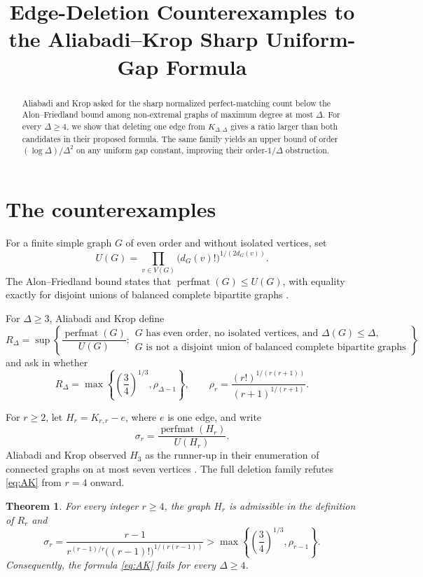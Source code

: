 \documentclass[11pt]{amsart}
\title[Edge-deletion counterexamples]
{Edge-Deletion Counterexamples to the Aliabadi--Krop
Sharp Uniform-Gap Formula}
\date{}
\newtheorem{theorem}{Theorem}
\theoremstyle{remark}
\newcommand{\perfmat}{\operatorname{perfmat}}
\begin{document}
\begin{abstract}
Aliabadi and Krop asked for the sharp normalized perfect-matching count
below the Alon--Friedland bound among non-extremal graphs of maximum degree
at most $\Delta$. For every $\Delta\ge4$, we show that deleting one edge
from $K_{\Delta,\Delta}$ gives a ratio larger than both candidates in their
proposed formula. The same family yields an upper bound of order
$(\log\Delta)/\Delta^2$ on any uniform gap constant, improving their
order-$1/\Delta$ obstruction.
\end{abstract}

\maketitle

\section{The counterexamples}

For a finite simple graph $G$ of even order and without isolated vertices, set
\[
U(G)=\prod_{v\in V(G)}\bigl(d_G(v)!\bigr)^{1/(2d_G(v))}.
\]
The Alon--Friedland bound states that
$\perfmat(G)\le U(G)$, with equality exactly for disjoint unions of
balanced complete bipartite graphs \cite{AlonFriedland}.

For $\Delta\ge3$, Aliabadi and Krop define
\[
R_\Delta=\sup\left\{
\frac{\perfmat(G)}{U(G)}:
\begin{array}{l}
G\text{ has even order, no isolated vertices, and }\Delta(G)\le\Delta,\\
G\text{ is not a disjoint union of balanced complete bipartite graphs}
\end{array}
\right\}
\]
and ask in \cite[Problem~4.9]{AliabadiKrop} whether
\begin{equation}\label{eq:AK}
R_\Delta=
\max\left\{\left(\frac34\right)^{1/3},\rho_{\Delta-1}\right\},
\qquad
\rho_r=\frac{(r!)^{1/(r(r+1))}}{(r+1)^{1/(r+1)}}.
\end{equation}

For $r\ge2$, let $H_r=K_{r,r}-e$, where $e$ is one edge, and write
\[
\sigma_r=\frac{\perfmat(H_r)}{U(H_r)}.
\]
Aliabadi and Krop observed $H_3$ as the runner-up in their enumeration of
connected graphs on at most seven vertices \cite[Remark~4.10]{AliabadiKrop}.
The full deletion family refutes \eqref{eq:AK} from $r=4$ onward.

\begin{theorem}\label{thm:main}
For every integer $r\ge4$, the graph $H_r$ is admissible in the definition
of $R_r$ and
\[
\sigma_r=
\frac{r-1}
{r^{(r-1)/r}\bigl((r-1)!\bigr)^{1/(r(r-1))}}
>
\max\left\{\left(\frac34\right)^{1/3},\rho_{r-1}\right\}.
\]
Consequently, the formula \eqref{eq:AK} fails for every $\Delta\ge4$.
\end{theorem}
\end{document}
